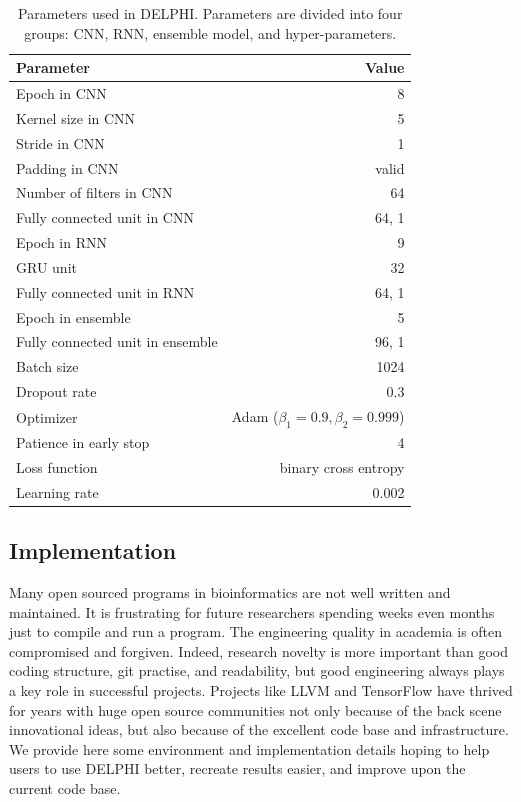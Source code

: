\begin{table}[htbp]
  \centering
  \caption{Parameters used in DELPHI. Parameters are divided into four groups: CNN, RNN, ensemble model, and hyper-parameters.}
    \begin{tabular}{lr}
    Parameter & Value \\
    \midrule
    \midrule
    Epoch in CNN & 8 \\
    Kernel size in CNN & 5 \\
    Stride in CNN & 1 \\
    Padding in CNN & valid \\
    Number of filters in CNN & 64 \\
    Fully connected unit in CNN & 64, 1 \\
    \midrule
    Epoch in RNN & 9 \\
    GRU unit & 32 \\
    Fully connected unit in RNN & 64, 1 \\
    \midrule
    Epoch in ensemble & 5 \\
    Fully connected unit in ensemble & 96, 1 \\
    \midrule
    Batch size & 1024 \\
    Dropout rate & 0.3 \\
    Optimizer & Adam ($\beta_1=0.9, \beta_2=0.999$) \\
    Patience in early stop & 4 \\
    Loss function & binary cross entropy \\
    Learning rate & 0.002 \\
    \bottomrule
    \end{tabular}%
  \label{tab_parameter}%
\end{table}%
\subsection{Implementation}
Many open sourced programs in bioinformatics are not well written and maintained. It is frustrating for future researchers spending weeks even months just to compile and run a program. The engineering quality in academia is often compromised and forgiven. Indeed, research novelty is more important than good coding structure, git practise, and readability, but good engineering always plays a key role in successful projects. Projects like LLVM \cite{lattner2004llvm} and TensorFlow \cite{tensorflow2015-whitepaper} have thrived for years with huge open source communities not only because of the back scene innovational ideas, but also because of the excellent code base and infrastructure. We provide here some environment and implementation details hoping to help users to use DELPHI better, recreate results easier, and improve upon the current code base.

